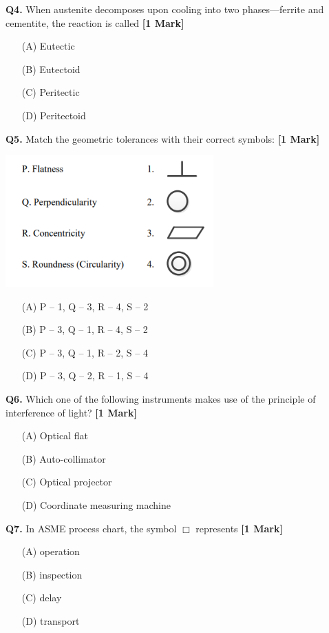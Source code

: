 \documentclass[11pt]{article}
\newcommand{\questiona}[2]{
    \noindent\textbf{Q#2.} #1 \hfill \textbf{[1 Mark]}
}
\begin{document}
\questiona{When austenite decomposes upon cooling into two phases—ferrite and cementite, the reaction is called}{4}
\begin{enumerate}
    \item[(A)] Eutectic
    \item[(B)] Eutectoid
    \item[(C)] Peritectic
    \item[(D)] Peritectoid
\end{enumerate}
\vspace{0.5cm}

\questiona{Match the geometric tolerances with their correct symbols:
}{5}
\begin{center}
\includegraphics[width=0.6\textwidth]{figures/5.png}
\end{center}
\begin{enumerate}
    \item[(A)] P – 1, Q – 3, R – 4, S – 2
    \item[(B)] P – 3, Q – 1, R – 4, S – 2
    \item[(C)] P – 3, Q – 1, R – 2, S – 4
    \item[(D)] P – 3, Q – 2, R – 1, S – 4
\end{enumerate}
\vspace{0.5cm}

\questiona{Which one of the following instruments makes use of the principle of interference of light?}{6}
\begin{enumerate}
    \item[(A)] Optical flat
    \item[(B)] Auto-collimator
    \item[(C)] Optical projector
    \item[(D)] Coordinate measuring machine
\end{enumerate}
\vspace{0.5cm}

\questiona{In ASME process chart, the symbol \( \Box \) represents}{7}
\begin{enumerate}
    \item[(A)] operation
    \item[(B)] inspection
    \item[(C)] delay
    \item[(D)] transport
\end{enumerate}
\vspace{0.5cm}
\end{document}
